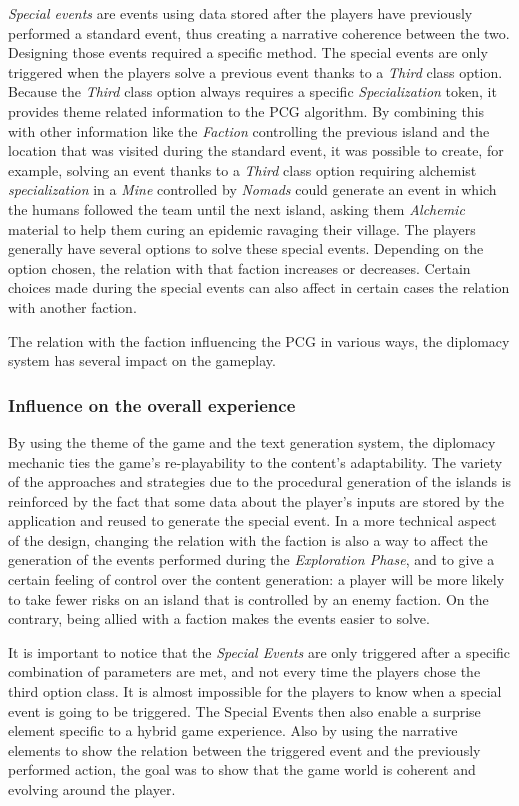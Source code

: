 \textit{Special events} are events using data stored after the players have previously performed a standard event, thus creating a narrative coherence between the two. Designing those events required a specific method. The special events are only triggered when the players solve a previous event thanks to a \textit{Third} class option. Because the \textit{Third} class option always requires a specific \textit{Specialization} token, it provides theme related information to the PCG algorithm. By combining this with other information like the \textit{Faction} controlling the previous island and the location that was visited during the standard event, it was possible to create, for example, solving an event thanks to a \textit{Third} class option requiring  alchemist \textit{specialization} in a \textit{Mine} controlled by \textit{Nomads} could generate an event in which the humans followed the team until the next island, asking them \textit{Alchemic} material to help them curing an epidemic ravaging their village. The players generally have several options to solve these special events. Depending on the option chosen, the relation with that faction increases or decreases. Certain choices made during the special events can also affect in certain cases the relation with another faction.

The relation with the faction influencing the PCG in various ways, the diplomacy system has several impact on the gameplay. 
\subsubsection{Influence on the overall experience}
By using the theme of the game and the text generation system, the diplomacy mechanic ties the game's re-playability to the content's adaptability. The variety of the approaches and strategies due to the procedural generation of the islands is reinforced by the fact that some data about the player's inputs are stored by the application and reused to generate the special event. 
In a more technical aspect of the design, changing the relation with the faction is also a way to affect the generation of the events performed during the \textit{Exploration Phase}, and to give a certain feeling of control over the content generation: a player will be more likely to take fewer risks on an island that is controlled by an enemy faction. On the contrary, being allied with a faction makes the events easier to solve.

It is important to notice that the \textit{Special Events} are only triggered after a specific combination of parameters are met, and not every time the players chose the third option class. It is almost impossible for the players to know when a special event is going to be triggered. The Special Events then also enable a surprise element specific to a hybrid game experience. Also by using the narrative elements to show the relation between the triggered event and the previously performed action, the goal was to show that the game world is coherent and evolving around the player. 
